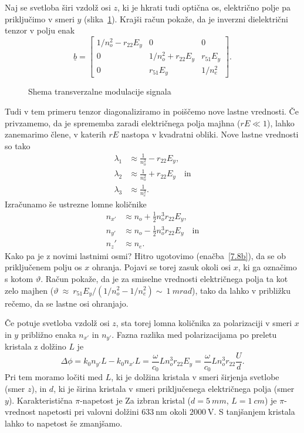 Naj se svetloba širi vzdolž osi $z$, ki je hkrati tudi optična os, 
električno polje pa priključimo v smeri $y$ (slika~\ref{fig:tmshema}). 
Krajši račun pokaže, da je inverzni dielektrični tenzor v polju enak
\begin{equation}
\underline{b} = 
 \left[\begin{array}{ccc}
1/n_o^2  -r_{22}E_y& 0& 0\\
0& 1/n_o^2+r_{22}E_y& r_{51}E_y\\
0 & r_{51}E_y&  1/n_e^2
\end{array}\right].
\label{7.8b}
\end{equation}

\begin{figure}[h]
\centering
\def\svgwidth{80truemm} 

\caption{Shema transverzalne modulacije signala}
\label{fig:tmshema}
\end{figure}

Tudi v tem primeru tenzor diagonaliziramo in poiščemo nove lastne vrednosti.
Če privzamemo, da je sprememba zaradi električnega polja majhna ($rE\ll1$), lahko
zanemarimo člene, v katerih $rE$ nastopa v kvadratni obliki. Nove lastne vrednosti so tako
\begin{align}
\lambda_1 &\approx \frac{1}{n_o^2}-r_{22}E_y, \\
\lambda_2 &\approx \frac{1}{n_o^2}+ r_{22}E_y\quad \mathrm{in} \\
\lambda_3 &\approx \frac{1}{n_e^2}.
\end{align}
Izračunamo še ustrezne lomne količnike 
\begin{align}
n_{x'} &\approx n_o+\frac{1}{2}n_o^3r_{22}E_y,\\
n_{y'} &\approx n_o-\frac{1}{2}n_o^3r_{22}E_y \quad \mathrm{in}\\
n_z' &\approx n_e.
\end{align}
Kako pa je z novimi lastnimi osmi? 
Hitro ugotovimo (enačba~\ref{7.8b}), da se ob
priključenem polju os $x$ ohranja. Pojavi se torej zasuk okoli osi $x$,
ki ga označimo s kotom $\vartheta$. Račun pokaže, da je za smiselne
vrednosti električnega polja ta kot zelo majhen ($\vartheta~
\approx~r_{51}E_y/(1/n_o^2-1/n_e^2) \sim~1~\si{mrad}$),
tako da lahko v približku rečemo, da se lastne osi ohranjajo. 

Če potuje svetloba vzdolž osi $z$, sta torej lomna količnika za 
polarizaciji v smeri $x$ in $y$ približno enaka $n_{x'}$ in $n_{y'}$. Fazna razlika med 
polarizacijama po preletu kristala z dolžino $L$ je 
\begin{equation}
\Delta \phi = k_0 n_{y'} L - k_0 n_{x'} L = \frac{\omega}{c_0}L 
n_o^3 r_{22}E_y = \frac{\omega}{c_0}L n_o^3 r_{22}\frac{U}{d}.
\label{fazaTM}
\end{equation}
Pri tem moramo ločiti med $L$, ki je dolžina kristala v smeri širjenja svetlobe
(smer $z$), in $d$, ki je širina kristala v smeri priključenega električnega polja 
(smer $y$). 
Karakteristična $\pi$-napetost je 
Za izbran kristal ($d=5~\si{mm}$, $L=1~\si{cm}$) je $\pi$-vrednost 
napetosti pri valovni dolžini $633~\si{\nano\metre}$ okoli $2000~\si{\volt}$. S tanjšanjem
kristala lahko to napetost še zmanjšamo.

